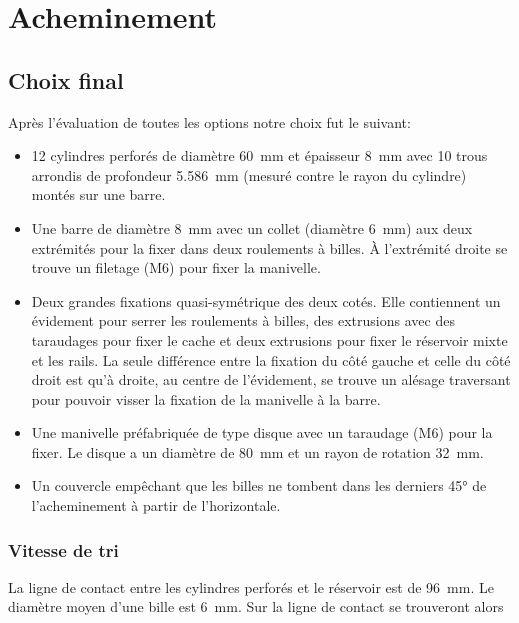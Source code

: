 \section{Acheminement}
\subsection{Choix final}
Après l'évaluation de toutes les options notre choix fut le suivant:
\begin{itemize}
	\item \num{12} cylindres perforés de diamètre \SI{60}{\milli\metre} et épaisseur \SI{8}{\milli\metre} avec \num{10} trous arrondis de profondeur \SI{5.586}{\milli\metre} (mesuré contre le rayon du cylindre) montés sur une barre.
	\item Une barre de diamètre \SI{8}{\milli\metre} avec un collet (diamètre \SI{6}{\milli\metre}) aux deux extrémités pour la fixer dans deux roulements à billes. À l'extrémité droite se trouve un filetage (M6) pour fixer la manivelle.
	\item Deux grandes fixations quasi-symétrique des deux cotés. Elle contiennent un évidement pour serrer les roulements à billes, des extrusions avec des taraudages pour fixer le cache et deux extrusions pour fixer le réservoir mixte et les rails. La seule différence entre la fixation du côté gauche et celle du côté droit est qu'à droite, au centre de l'évidement, se trouve un alésage traversant pour pouvoir visser la fixation de la manivelle à la barre.
	\item Une manivelle préfabriquée de type disque avec un taraudage (M6) pour la fixer. Le disque a un diamètre de \SI{80}{\milli\metre} et un rayon de rotation  \SI{32}{\milli\metre}.
	\item Un couvercle empêchant que les billes ne tombent dans les derniers \ang{45} de l'acheminement à partir de l'horizontale.
\end{itemize}


\subsubsection{Vitesse de tri}
La ligne de contact entre les cylindres perforés et le réservoir est de \SI{96}{\milli\metre}. Le diamètre moyen d'une bille est \SI{6}{\milli\metre}. Sur la ligne de contact se trouveront alors

